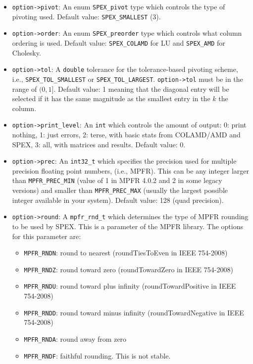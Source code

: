 \documentclass[12pt]{report}
\theoremstyle{definition}
\begin{document}
\begin{itemize}
\item
\verb|option->pivot|: An enum \verb|SPEX_pivot| type which controls the type of pivoting used. Default value:
\verb|SPEX_SMALLEST| (3).

\item
\verb|option->order|: An enum \verb|SPEX_preorder| type which controls what column ordering is used. Default value: \verb|SPEX_COLAMD| for LU and \verb|SPEX_AMD| for Cholesky.

\item
\verb|option->tol|: A \verb|double| tolerance for
the tolerance-based pivoting scheme, i.e., \verb|SPEX_TOL_SMALLEST| or
\verb|SPEX_TOL_LARGEST|. \verb|option->tol| must be in the range of $(0,1]$.
Default value: 1 meaning that the diagonal entry will be selected if it has the
same magnitude as the smallest entry in the $k$ the column.

\item
\verb|option->print_level|: An \verb|int| which controls the amount of
output:
0: print nothing, 1: just errors, 2: terse, with basic stats from
COLAMD/AMD and SPEX, 3: all, with matrices and results. Default value: 0.

\item
\verb|option->prec|: An \verb|int32_t| which specifies the precision used
for multiple precision floating point numbers, (i.e., MPFR). This
can be any integer larger than \verb|MPFR_PREC_MIN| (value of 1 in MPFR 4.0.2
and 2 in some legacy versions) and smaller than \verb|MPFR_PREC_MAX| (usually
the largest possible integer available in your system). Default value: 128
(quad precision).

\item
\verb|option->round|: A \verb|mpfr_rnd_t| which determines the type
of MPFR rounding to be used by SPEX. This is a parameter of the MPFR
library. The options for this parameter are:

    \begin{itemize}
        \item \verb|MPFR_RNDN|: round to nearest
            (roundTiesToEven in IEEE 754-2008)
        \item \verb|MPFR_RNDZ|: round toward zero
            (roundTowardZero in IEEE 754-2008)
        \item \verb|MPFR_RNDU|: round toward plus infinity
            (roundTowardPositive in IEEE 754-2008)
        \item \verb|MPFR_RNDD|: round toward minus infinity
            (roundTowardNegative in IEEE 754-2008)
        \item \verb|MPFR_RNDA|: round away from zero
        \item \verb|MPFR_RNDF|: faithful rounding. This is not stable.
    \end{itemize}


\end{itemize}
\end{document}
